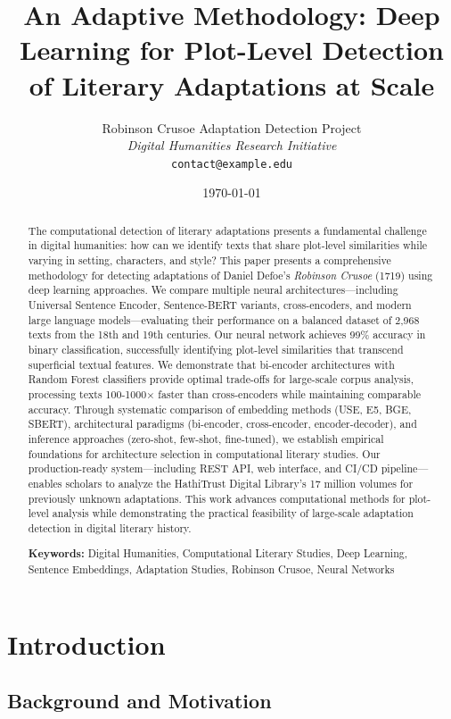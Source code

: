 \documentclass[12pt,a4paper]{article}
\title{\textbf{An Adaptive Methodology: Deep Learning for Plot-Level Detection of Literary Adaptations at Scale}}
\author{
    Robinson Crusoe Adaptation Detection Project\\
    \textit{Digital Humanities Research Initiative}\\
    \texttt{contact@example.edu}
}
\date{\today}
\begin{document}
\maketitle

\begin{abstract}
The computational detection of literary adaptations presents a fundamental challenge in digital humanities: how can we identify texts that share plot-level similarities while varying in setting, characters, and style? This paper presents a comprehensive methodology for detecting adaptations of Daniel Defoe's \textit{Robinson Crusoe} (1719) using deep learning approaches. We compare multiple neural architectures—including Universal Sentence Encoder, Sentence-BERT variants, cross-encoders, and modern large language models—evaluating their performance on a balanced dataset of 2,968 texts from the 18th and 19th centuries. Our neural network achieves 99\% accuracy in binary classification, successfully identifying plot-level similarities that transcend superficial textual features. We demonstrate that bi-encoder architectures with Random Forest classifiers provide optimal trade-offs for large-scale corpus analysis, processing texts 100-1000× faster than cross-encoders while maintaining comparable accuracy. Through systematic comparison of embedding methods (USE, E5, BGE, SBERT), architectural paradigms (bi-encoder, cross-encoder, encoder-decoder), and inference approaches (zero-shot, few-shot, fine-tuned), we establish empirical foundations for architecture selection in computational literary studies. Our production-ready system—including REST API, web interface, and CI/CD pipeline—enables scholars to analyze the HathiTrust Digital Library's 17 million volumes for previously unknown adaptations. This work advances computational methods for plot-level analysis while demonstrating the practical feasibility of large-scale adaptation detection in digital literary history.

\textbf{Keywords:} Digital Humanities, Computational Literary Studies, Deep Learning, Sentence Embeddings, Adaptation Studies, Robinson Crusoe, Neural Networks
\end{abstract}

\newpage
\tableofcontents
\newpage

\section{Introduction}

\subsection{Background and Motivation}
\end{document}
